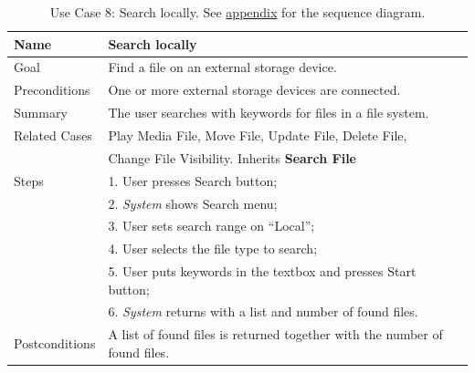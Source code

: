 \begin{table}[h!]
\centering
\begin{tabular}{|l|l|}
\hline
Name & Search locally\\ \hline
Goal & Find a file on an external storage device.\\ \hline
Preconditions & One or more external storage devices are connected. \\ \hline
Summary & The user searches with keywords for files in a file system.\\ \hline

Related Cases & Play Media File, Move File, Update File, Delete File, \\ 
              & Change File Visibility. Inherits \textbf{Search File} \\ \hline
Steps &  1. User presses Search button; \\
      &  2. \textit{System} shows Search menu; \\
      &  3. User sets search range on ``Local''; \\
      &  4. User selects the file type to search; \\
      &  5. User puts keywords in the textbox and presses Start button; \\
      &  6. \textit{System} returns with a list and number of found files. 
        \\ \hline
Postconditions & A list of found files is returned together with the number of found files.
\\ \hline
\end{tabular}
\caption{Use Case 8: Search locally. See \hyperref[fig:req_seq4]{appendix} for the sequence diagram.}
\label{tab:UC8}
\end{table}

